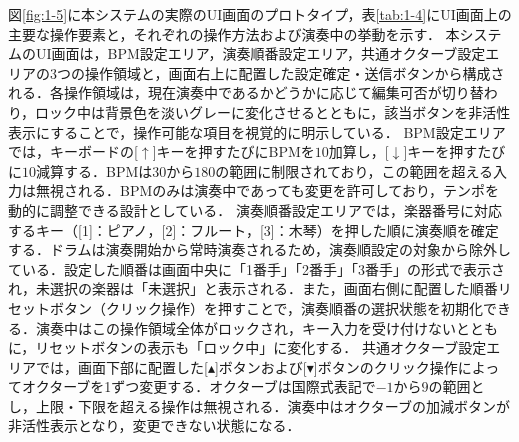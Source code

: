 \documentclass[uplatex,dvipdfmx]{jlreq}
\begin{document}
図\ref{fig:1-5}に本システムの実際のUI画面のプロトタイプ，表\ref{tab:1-4}にUI画面上の主要な操作要素と，それぞれの操作方法および演奏中の挙動を示す．
本システムのUI画面は，BPM設定エリア，演奏順番設定エリア，共通オクターブ設定エリアの3つの操作領域と，画面右上に配置した設定確定・送信ボタンから構成される．各操作領域は，現在演奏中であるかどうかに応じて編集可否が切り替わり，ロック中は背景色を淡いグレーに変化させるとともに，該当ボタンを非活性表示にすることで，操作可能な項目を視覚的に明示している．
BPM設定エリアでは，キーボードの[$\uparrow$]キーを押すたびにBPMを$10$加算し，[$\downarrow$]キーを押すたびに$10$減算する．BPMは$30$から$180$の範囲に制限されており，この範囲を超える入力は無視される．BPMのみは演奏中であっても変更を許可しており，テンポを動的に調整できる設計としている．
演奏順番設定エリアでは，楽器番号に対応するキー（[1]：ピアノ，[2]：フルート，[3]：木琴）を押した順に演奏順を確定する．ドラムは演奏開始から常時演奏されるため，演奏順設定の対象から除外している．設定した順番は画面中央に「1番手」「2番手」「3番手」の形式で表示され，未選択の楽器は「未選択」と表示される．また，画面右側に配置した順番リセットボタン（クリック操作）を押すことで，演奏順番の選択状態を初期化できる．演奏中はこの操作領域全体がロックされ，キー入力を受け付けないとともに，リセットボタンの表示も「ロック中」に変化する．
共通オクターブ設定エリアでは，画面下部に配置した[$\blacktriangle$]ボタンおよび[$\blacktriangledown$]ボタンのクリック操作によってオクターブを1ずつ変更する．オクターブは国際式表記で$-1$から$9$の範囲とし，上限・下限を超える操作は無視される．演奏中はオクターブの加減ボタンが非活性表示となり，変更できない状態になる．
\end{document}
